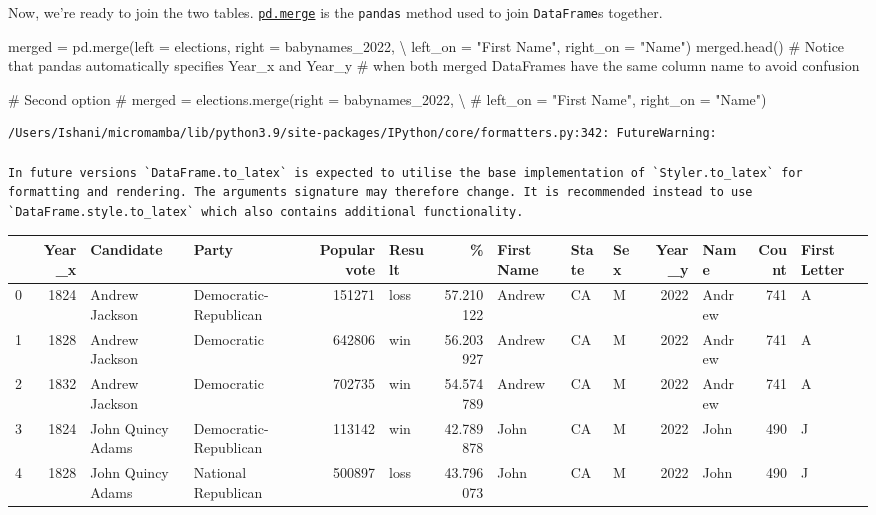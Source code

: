 \documentclass[
  letterpaper,
  DIV=11,
  numbers=noendperiod]{scrreprt}
\newenvironment{Shaded}{\begin{snugshade}}{\end{snugshade}}
\newcommand{\CommentTok}[1]{\textcolor[rgb]{0.37,0.37,0.37}{#1}}
\newcommand{\NormalTok}[1]{\textcolor[rgb]{0.00,0.23,0.31}{#1}}
\newcommand{\OperatorTok}[1]{\textcolor[rgb]{0.37,0.37,0.37}{#1}}
\newcommand{\StringTok}[1]{\textcolor[rgb]{0.13,0.47,0.30}{#1}}
\begin{document}
Now, we're ready to join the two tables.
\href{https://pandas.pydata.org/docs/reference/api/pandas.DataFrame.merge.html}{\texttt{pd.merge}}
is the \texttt{pandas} method used to join \texttt{DataFrame}s together.

\begin{Shaded}
\begin{Highlighting}[]
\NormalTok{merged }\OperatorTok{=}\NormalTok{ pd.merge(left }\OperatorTok{=}\NormalTok{ elections, right }\OperatorTok{=}\NormalTok{ babynames\_2022, }\OperatorTok{\textbackslash{}}
\NormalTok{                  left\_on }\OperatorTok{=} \StringTok{"First Name"}\NormalTok{, right\_on }\OperatorTok{=} \StringTok{"Name"}\NormalTok{)}
\NormalTok{merged.head()}
\CommentTok{\# Notice that pandas automatically specifies \textasciigrave{}Year\_x\textasciigrave{} and \textasciigrave{}Year\_y\textasciigrave{} }
\CommentTok{\# when both merged DataFrames have the same column name to avoid confusion}

\CommentTok{\# Second option}
\CommentTok{\# merged = elections.merge(right = babynames\_2022, \textbackslash{}}
    \CommentTok{\# left\_on = "First Name", right\_on = "Name")}
\end{Highlighting}
\end{Shaded}

\begin{verbatim}
/Users/Ishani/micromamba/lib/python3.9/site-packages/IPython/core/formatters.py:342: FutureWarning:

In future versions `DataFrame.to_latex` is expected to utilise the base implementation of `Styler.to_latex` for formatting and rendering. The arguments signature may therefore change. It is recommended instead to use `DataFrame.style.to_latex` which also contains additional functionality.
\end{verbatim}

\begin{tabular}{lrllrlrlllrlrl}
\toprule
{} &  Year\_x &          Candidate &                  Party &  Popular vote & Result &          \% & First Name & State & Sex &  Year\_y &    Name &  Count & First Letter \\
\midrule
0 &    1824 &     Andrew Jackson &  Democratic-Republican &        151271 &   loss &  57.210122 &     Andrew &    CA &   M &    2022 &  Andrew &    741 &            A \\
1 &    1828 &     Andrew Jackson &             Democratic &        642806 &    win &  56.203927 &     Andrew &    CA &   M &    2022 &  Andrew &    741 &            A \\
2 &    1832 &     Andrew Jackson &             Democratic &        702735 &    win &  54.574789 &     Andrew &    CA &   M &    2022 &  Andrew &    741 &            A \\
3 &    1824 &  John Quincy Adams &  Democratic-Republican &        113142 &    win &  42.789878 &       John &    CA &   M &    2022 &    John &    490 &            J \\
4 &    1828 &  John Quincy Adams &    National Republican &        500897 &   loss &  43.796073 &       John &    CA &   M &    2022 &    John &    490 &            J \\
\bottomrule
\end{tabular}
\end{document}
